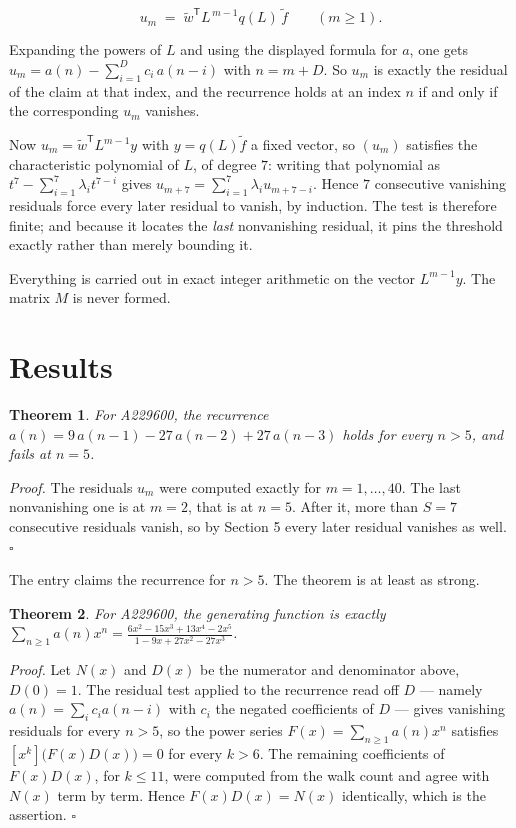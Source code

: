 \documentclass[11pt]{article}
\newtheorem{theorem}{Theorem}
\theoremstyle{definition}
\begin{document}
\[u_m \;=\; \tilde w^{\mathsf T} L^{\,m-1} q(L)\,\tilde f \qquad (m \ge 1).\]

Expanding the powers of $L$ and using the displayed formula for $a$, one gets $u_m = a(n) - \sum_{i=1}^{D} c_i\,a(n-i)$ with $n = m + D$. So $u_m$ is exactly the residual of the claim at that index, and the recurrence holds at an index $n$ if and only if the corresponding $u_m$ vanishes.

Now $u_m = \tilde w^{\mathsf T} L^{m-1} y$ with $y = q(L)\tilde f$ a fixed vector, so $(u_m)$ satisfies the characteristic polynomial of $L$, of degree $7$: writing that polynomial as $t^{7} - \sum_{i=1}^{7} \lambda_i t^{7-i}$ gives $u_{m+7} = \sum_{i=1}^{7} \lambda_i u_{m+7-i}$. Hence $7$ consecutive vanishing residuals force every later residual to vanish, by induction. The test is therefore finite; and because it locates the {\itshape last} nonvanishing residual, it pins the threshold exactly rather than merely bounding it.

Everything is carried out in exact integer arithmetic on the vector $L^{m-1}y$. The matrix $M$ is never formed.

\section{Results}

\begin{theorem} For A229600, the recurrence $a(n) = 9\,a(n-1) - 27\,a(n-2) + 27\,a(n-3)$ holds for every $n > 5$, and fails at $n = 5$.\end{theorem}

{\itshape Proof.} The residuals $u_m$ were computed exactly for $m = 1,\dots,40$. The last nonvanishing one is at $m = 2$, that is at $n = 5$. After it, more than $S = 7$ consecutive residuals vanish, so by Section 5 every later residual vanishes as well. $\square$

The entry claims the recurrence for $n > 5$. The theorem is at least as strong.

\begin{theorem} For A229600, the generating function is exactly $\sum_{n\ge 1} a(n)x^n = \frac{6x^{2} - 15x^{3} + 13x^{4} - 2x^{5}}{1 - 9x + 27x^{2} - 27x^{3}}$.\end{theorem}

{\itshape Proof.} Let $N(x)$ and $D(x)$ be the numerator and denominator above, $D(0)=1$. The residual test applied to the recurrence read off $D$ --- namely $a(n) = \sum_i c_i a(n-i)$ with $c_i$ the negated coefficients of $D$ --- gives vanishing residuals for every $n > 5$, so the power series $F(x)=\sum_{n\ge 1}a(n)x^n$ satisfies $[x^k]\bigl(F(x)D(x)\bigr) = 0$ for every $k > 6$. The remaining coefficients of $F(x)D(x)$, for $k \le 11$, were computed from the walk count and agree with $N(x)$ term by term. Hence $F(x)D(x) = N(x)$ identically, which is the assertion. $\square$
\end{document}
